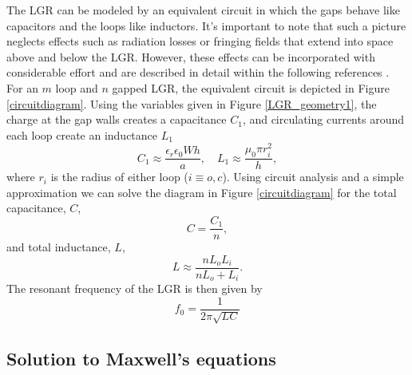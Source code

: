 The LGR can be modeled by an equivalent circuit in which the gaps behave like capacitors and the loops like inductors. It's important to note that such a picture neglects effects such as radiation losses or fringing fields that extend into space above and below the LGR. However, these effects can be incorporated with considerable effort and are described in detail within the following references \cite{mehdizadeh1983Loop, rinard2005loopgap, wood1984loop}. For an $m$ loop and $n$ gapped LGR, the equivalent circuit is depicted in Figure \ref{circuitdiagram}. Using the variables given in Figure \ref{LGR_geometry1}, the charge at the gap walls creates a capacitance $C_1$, and circulating currents around each loop create an inductance $L_1$
\begin{equation} \label{indcap}
C_1 \approx \frac{\epsilon_r \epsilon_0 W h}{a}, \quad L_1 \approx \frac{\mu_0 \pi r_i^2}{h}, 
\end{equation}
where $r_i$ is the radius of either loop ($i \equiv o,c$). Using circuit analysis and a simple approximation we can solve the diagram in Figure \ref{circuitdiagram} for the total capacitance, $C$,
\begin{equation}\label{capacitance}
C = \frac{C_1}{n},
\end{equation} 
and total inductance, $L$,
\begin{equation}\label{inductance}
L \approx \frac{n L_o L_i}{n L_o + L_i}.
\end{equation}
The resonant frequency of the LGR is then given by 
\begin{equation}
f_0 = \frac{1}{2 \pi \sqrt{LC}}
\end{equation}


\subsection{Solution to Maxwell's equations} \label{fields}

